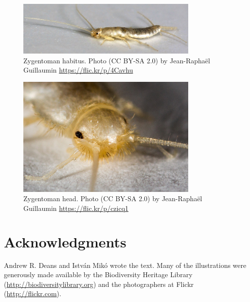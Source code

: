 \documentclass[letterpaper, 11pt]{article}
\begin{document}
\begin{figure}[ht!]
  \centering
    \includegraphics[width=0.8\textwidth]{image22}
  \caption{Zygentoman habitus. Photo (CC BY-SA 2.0) by Jean-Rapha\"el Guillaumin \url{https://flic.kr/p/4Cavhu}}
  \label{fig:zygenhabit}
\end{figure}

\begin{figure}[ht!]
  \centering
    \includegraphics[width=0.8\textwidth]{image12}
  \caption{Zygentoman head. Photo (CC BY-SA 2.0) by Jean-Rapha\"el Guillaumin \url{https://flic.kr/p/czicq1}}
  \label{fig:zygenhead}
\end{figure}

\section*{Acknowledgments}
Andrew R. Deans and Istv\'an Mik\'o wrote the text. Many of the illustrations were generously made available by the Biodiversity Heritage Library (\url{http://biodiversitylibrary.org}) and the photographers at Flickr (\url{http://flickr.com}).
\FloatBarrier


\end{document}
